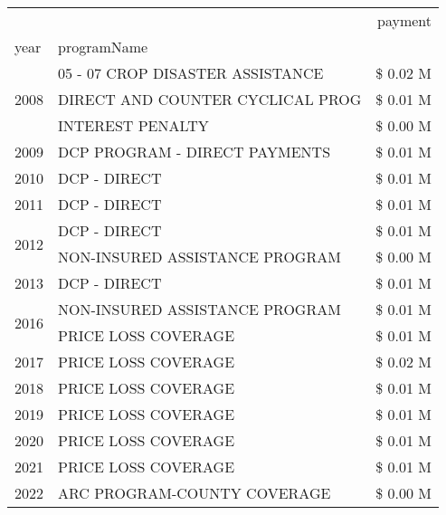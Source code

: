 \begin{tabular}{llr}
\toprule
 &  & payment \\
year & programName &  \\
\midrule
\multirow[t]{3}{*}{2008} & 05 - 07 CROP DISASTER ASSISTANCE & \$ 0.02 M \\
 & DIRECT AND COUNTER CYCLICAL PROG & \$ 0.01 M \\
 & INTEREST PENALTY & \$ 0.00 M \\
\cline{1-3}
2009 & DCP PROGRAM - DIRECT PAYMENTS & \$ 0.01 M \\
\cline{1-3}
2010 & DCP - DIRECT & \$ 0.01 M \\
\cline{1-3}
2011 & DCP - DIRECT & \$ 0.01 M \\
\cline{1-3}
\multirow[t]{2}{*}{2012} & DCP - DIRECT & \$ 0.01 M \\
 & NON-INSURED ASSISTANCE PROGRAM & \$ 0.00 M \\
\cline{1-3}
2013 & DCP - DIRECT & \$ 0.01 M \\
\cline{1-3}
\multirow[t]{2}{*}{2016} & NON-INSURED ASSISTANCE PROGRAM & \$ 0.01 M \\
 & PRICE LOSS COVERAGE & \$ 0.01 M \\
\cline{1-3}
2017 & PRICE LOSS COVERAGE & \$ 0.02 M \\
\cline{1-3}
2018 & PRICE LOSS COVERAGE & \$ 0.01 M \\
\cline{1-3}
2019 & PRICE LOSS COVERAGE & \$ 0.01 M \\
\cline{1-3}
2020 & PRICE LOSS COVERAGE & \$ 0.01 M \\
\cline{1-3}
2021 & PRICE LOSS COVERAGE & \$ 0.01 M \\
\cline{1-3}
2022 & ARC PROGRAM-COUNTY COVERAGE & \$ 0.00 M \\
\cline{1-3}
\bottomrule
\end{tabular}
